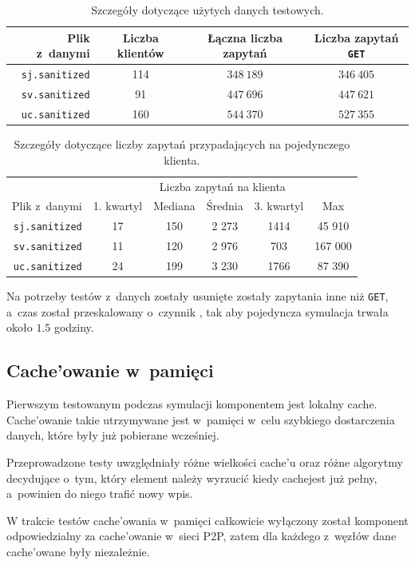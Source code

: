 \documentclass[a4paper,11pt]{scrartcl}
\newcommand{\f}{\texttt}
\newcommand{\s}{ }
\newcommand{\kesz}{cache}
\newcommand{\keszu}{cache'u}
\newcommand{\keszowania}{cache'owania}
\newcommand{\keszowane}{cache'owane}
\newcommand{\keszowanie}{cache'owanie}
\newcommand{\Keszowanie}{Cache'owanie}
\begin{document}
\begin{table}[h!]
\centering
\begin{tabular}{r c c c}
Plik z~danymi & Liczba klientów & Łączna liczba zapytań & Liczba zapytań \f{GET}\\
\hline
\f{sj.sanitized} & 114 & $348~189$ & $346~405$\\
\f{sv.sanitized} & 91 & $447~696$ & $447~621$\\
\f{uc.sanitized} & 160 & $544~370$ & $527~355$\\
\end{tabular}
\caption{Szczegóły dotyczące użytych danych testowych.}
\label{tab_testdata}
\end{table}

\begin{table}[h!]
\centering
\begin{tabular}{r c c c c c}
 & \multicolumn{5}{c}{Liczba zapytań na klienta} \\
Plik z~danymi & 1. kwartyl & Mediana & Średnia & 3. kwartyl & Max \\
\hline
\f{sj.sanitized} & 17 & 150 & 2 273 & 1414 & 45 910  \\
\f{sv.sanitized} & 11 & 120 & 2 976 & 703 & 167 000 \\
\f{uc.sanitized} & 24 & 199 & 3 230 & 1766 & 87 390  \\
\end{tabular}
\caption{Szczegóły dotyczące liczby zapytań przypadających na pojedynczego klienta.}
\label{tab_testdata2}
\end{table}

Na potrzeby testów z~danych zostały usunięte zostały zapytania inne niż \f{GET}, a~czas został przeskalowany o~czynnik , tak aby pojedyncza symulacja trwała około $1.5$ godziny.

\subsection{\Keszowanie\s w~pamięci}
\label{sect_tests_mem}
Pierwszym testowanym podczas symulacji komponentem jest lokalny \kesz. \Keszowanie\s takie utrzymywane jest w~pamięci w~celu szybkiego dostarczenia danych, które były już pobierane wcześniej.

Przeprowadzone testy uwzględniały różne wielkości \keszu\s oraz różne algorytmy decydujące o~tym, który element należy wyrzucić kiedy \kesz jest już pełny, a~powinien do niego trafić nowy wpis.

W trakcie testów \keszowania\s w~pamięci całkowicie wyłączony został komponent odpowiedzialny za \keszowanie\s w~sieci P2P, zatem dla każdego z~węzłów dane \keszowane\s były niezależnie.
\end{document}
